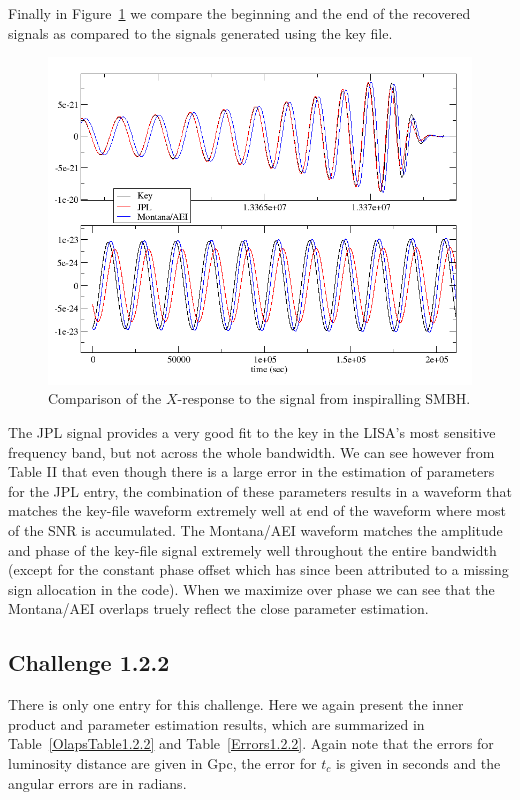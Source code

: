 \documentclass[11pt]{article}
\begin{document}
Finally in Figure~\ref{fig1.2.1} we compare the beginning and the end of the recovered signals as compared to the signals generated using the key file. 

\begin{figure}[ht]
\includegraphics[angle=0,width=1.0\textwidth]{1_2_1X.png}
\caption{Comparison of the $X$-response to the signal from inspiralling SMBH. }
\label{fig1.2.1}
\end{figure}

The JPL signal provides a very good fit to the key in the LISA's most sensitive frequency band, but not across the whole bandwidth.  We can see however from Table II that even though there is a large error in the estimation of parameters for the JPL entry, the combination of these parameters results in a waveform that matches  the key-file waveform extremely well at end of the waveform where most of the SNR is accumulated.  The Montana/AEI waveform matches the amplitude and phase of the key-file signal extremely well throughout the entire bandwidth (except for the constant phase offset which has since been attributed to a missing sign allocation in the code).  When we maximize over phase we can see that the Montana/AEI overlaps truely reflect the close parameter estimation. 

 
\subsection{Challenge 1.2.2}

There is only one entry for this challenge. Here we again present the inner product and parameter estimation results, which are summarized in Table~\ref{OlapsTable1.2.2} and Table~\ref{Errors1.2.2}.  Again note that the errors for luminosity distance are given in Gpc, the error for $t_{c}$ is given in seconds and the angular errors are in radians.
\end{document}
